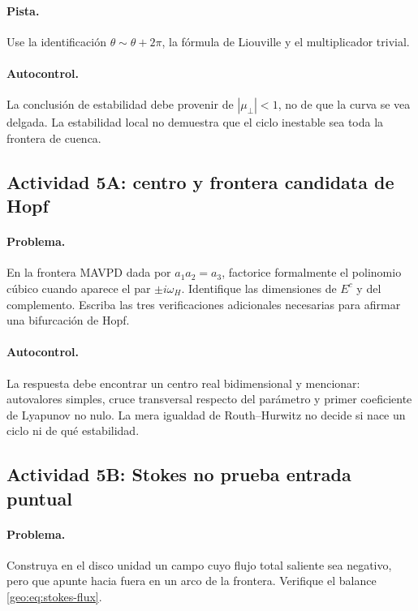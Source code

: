 \paragraph{Pista.}
Use la identificación \(\theta\sim\theta+2\pi\), la fórmula de Liouville y el
multiplicador trivial.

\paragraph{Autocontrol.}
La conclusión de estabilidad debe provenir de \(|\mu_\perp|<1\), no de que la
curva se vea delgada. La estabilidad local no demuestra que el ciclo
inestable sea toda la frontera de cuenca.

\subsection{Actividad 5A: centro y frontera candidata de Hopf}

\paragraph{Problema.}
En la frontera MAVPD dada por \(a_1a_2=a_3\), factorice formalmente el
polinomio cúbico cuando aparece el par \(\pm i\omega_H\). Identifique las
dimensiones de \(E^c\) y del complemento. Escriba las tres verificaciones
adicionales necesarias para afirmar una bifurcación de Hopf.

\paragraph{Autocontrol.}
La respuesta debe encontrar un centro real bidimensional y mencionar:
autovalores simples, cruce transversal respecto del parámetro y primer
coeficiente de Lyapunov no nulo. La mera igualdad de Routh--Hurwitz no decide
si nace un ciclo ni de qué estabilidad.

\subsection{Actividad 5B: Stokes no prueba entrada puntual}

\paragraph{Problema.}
Construya en el disco unidad un campo cuyo flujo total saliente sea negativo,
pero que apunte hacia fuera en un arco de la frontera. Verifique el balance
\eqref{geo:eq:stokes-flux}.

